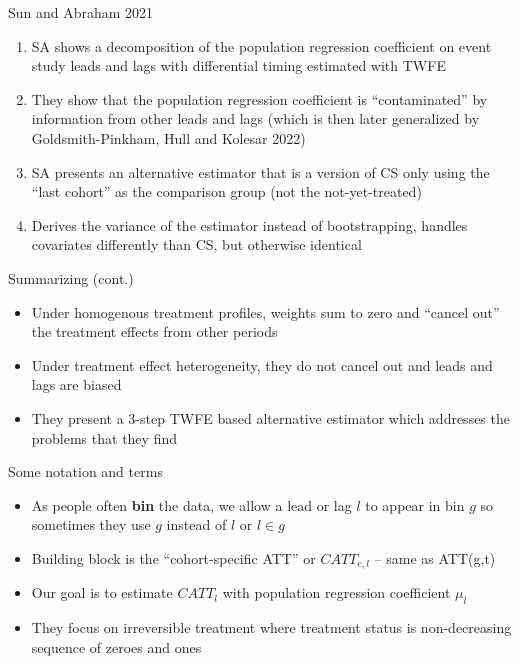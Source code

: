 \documentclass{beamer}
\begin{document}
\begin{frame}{Sun and Abraham 2021}

	\begin{enumerate}
	\item SA shows a decomposition of the population regression coefficient on event study leads and lags with differential timing estimated with TWFE
	\item They show that the population regression coefficient is ``contaminated'' by information from other leads and lags (which is then later generalized by Goldsmith-Pinkham, Hull and Kolesar 2022)
	\item SA presents an alternative estimator that is a version of CS only using the ``last cohort'' as the comparison group (not the not-yet-treated)
	\item Derives the variance of the estimator instead of bootstrapping, handles covariates differently than CS, but otherwise identical
	\end{enumerate}

\end{frame}

\begin{frame}{Summarizing (cont.)}

\begin{itemize}
\item Under homogenous treatment profiles, weights sum to zero and ``cancel out'' the treatment effects from other periods 
\item Under treatment effect heterogeneity, they do not cancel out and leads and lags are biased
\item They present a 3-step TWFE based alternative estimator which addresses the problems that they find
\end{itemize}

\end{frame}


\begin{frame}{Some notation and terms}

\begin{itemize}
\item As people often \textbf{bin} the data, we allow a lead or lag $l$ to appear in bin $g$ so sometimes they use $g$ instead of $l$ or $l \in g$
\item Building block is the ``cohort-specific ATT'' or $CATT_{e,l}$ -- same as ATT(g,t)
\item Our goal is to estimate $CATT_{l}$ with population regression coefficient $\mu_l$
\item They focus on irreversible treatment where treatment status is non-decreasing sequence of zeroes and ones
\end{itemize}

\end{frame}
\end{document}

